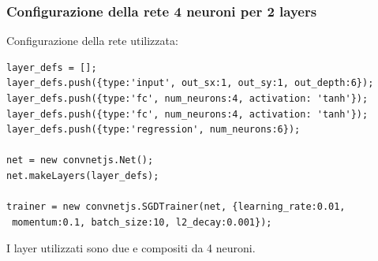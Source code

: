 \subsubsection{Configurazione della rete  4 neuroni per 2 layers}
\label{Configurazione della rete 4 neuroni per 2 layers}

Configurazione della rete utilizzata:\\
\begin{verbatim}layer_defs = [];
layer_defs.push({type:'input', out_sx:1, out_sy:1, out_depth:6});
layer_defs.push({type:'fc', num_neurons:4, activation: 'tanh'});
layer_defs.push({type:'fc', num_neurons:4, activation: 'tanh'});
layer_defs.push({type:'regression', num_neurons:6});

net = new convnetjs.Net();
net.makeLayers(layer_defs);

trainer = new convnetjs.SGDTrainer(net, {learning_rate:0.01,
 momentum:0.1, batch_size:10, l2_decay:0.001});
\end{verbatim}
\noindent
I layer utilizzati sono due e compositi da 4 neuroni.

